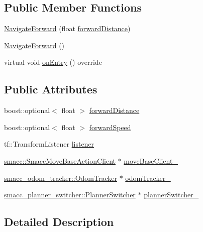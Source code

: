 \subsection*{Public Member Functions}
\begin{DoxyCompactItemize}
\item 
\hyperlink{classNavigateForward_a45fc93000c710b0a31b34d2dd2fa3625}{Navigate\+Forward} (float \hyperlink{classNavigateForward_ad2b2157f0a2c94fd9e1f11ae22d203fc}{forward\+Distance})
\item 
\hyperlink{classNavigateForward_a49125886df55eb4253f95dc8e3e45ba3}{Navigate\+Forward} ()
\item 
virtual void \hyperlink{classNavigateForward_a2a1ad66b031773aeac11663020afebba}{on\+Entry} () override
\end{DoxyCompactItemize}
\subsection*{Public Attributes}
\begin{DoxyCompactItemize}
\item 
boost\+::optional$<$ float $>$ \hyperlink{classNavigateForward_ad2b2157f0a2c94fd9e1f11ae22d203fc}{forward\+Distance}
\item 
boost\+::optional$<$ float $>$ \hyperlink{classNavigateForward_a887de966940cd56b2c159a5b08e9f9e0}{forward\+Speed}
\item 
tf\+::\+Transform\+Listener \hyperlink{classNavigateForward_a40927a8ea2a861c7bb3ece9256600552}{listener}
\item 
\hyperlink{classsmacc_1_1SmaccMoveBaseActionClient}{smacc\+::\+Smacc\+Move\+Base\+Action\+Client} $\ast$ \hyperlink{classNavigateForward_adeec3efc00297e64467a83d5ef82c44c}{move\+Base\+Client\+\_\+}
\item 
\hyperlink{classsmacc__odom__tracker_1_1OdomTracker}{smacc\+\_\+odom\+\_\+tracker\+::\+Odom\+Tracker} $\ast$ \hyperlink{classNavigateForward_a1805443ef8d8fe292af6bde6298e43c9}{odom\+Tracker\+\_\+}
\item 
\hyperlink{classsmacc__planner__switcher_1_1PlannerSwitcher}{smacc\+\_\+planner\+\_\+switcher\+::\+Planner\+Switcher} $\ast$ \hyperlink{classNavigateForward_a61052be8826f5bce96f56bfd0a0a8339}{planner\+Switcher\+\_\+}
\end{DoxyCompactItemize}


\subsection{Detailed Description}


